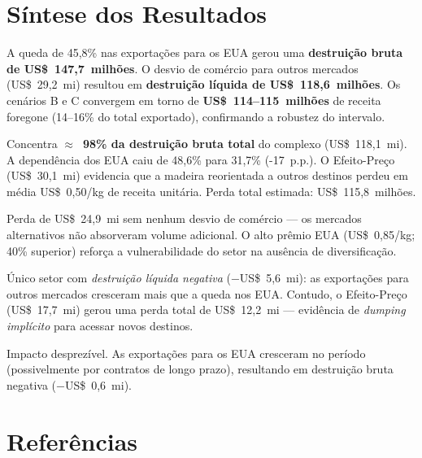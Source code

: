 \documentclass[12pt, a4paper]{article}
\begin{document}
\section{Síntese dos Resultados}

\begin{description}[style=nextline]
  \item[Complexo Florestal (consolidado)]
    A queda de 45,8\% nas exportações para os EUA gerou uma
    \textbf{destruição bruta de US\$~147,7~milhões}.
    O desvio de comércio para outros mercados (US\$~29,2~mi) resultou em
    \textbf{destruição líquida de US\$~118,6~milhões}.
    Os cenários B e C convergem em torno de \textbf{US\$~114--115~milhões}
    de receita foregone (14--16\% do total exportado), confirmando a
    robustez do intervalo.

  \item[Madeira (CNAE 16)]
    Concentra \textbf{$\approx$~98\% da destruição bruta total} do complexo
    (US\$~118,1~mi). A dependência dos EUA caiu de 48,6\% para 31,7\%
    (-17~p.p.). O Efeito-Preço (US\$~30,1~mi) evidencia que a madeira
    reorientada a outros destinos perdeu em média US\$~0,50/kg de receita unitária.
    Perda total estimada: US\$~115,8~milhões.

  \item[Móveis (CNAE 31)]
    Perda de US\$~24,9~mi sem nenhum desvio de comércio —
    os mercados alternativos não absorveram volume adicional.
    O alto prêmio EUA (US\$~0,85/kg; 40\% superior) reforça a
    vulnerabilidade do setor na ausência de diversificação.

  \item[Papel e Celulose (CNAE 17)]
    Único setor com \emph{destruição líquida negativa} (−US\$~5,6~mi):
    as exportações para outros mercados cresceram mais que a queda nos EUA.
    Contudo, o Efeito-Preço (US\$~17,7~mi) gerou uma perda total de
    US\$~12,2~mi — evidência de \emph{dumping implícito} para acessar novos destinos.

  \item[Base Florestal (CNAE 2)]
    Impacto desprezível. As exportações para os EUA cresceram no período
    (possivelmente por contratos de longo prazo), resultando em destruição
    bruta negativa (−US\$~0,6~mi).
\end{description}

\section*{Referências}
\end{document}
